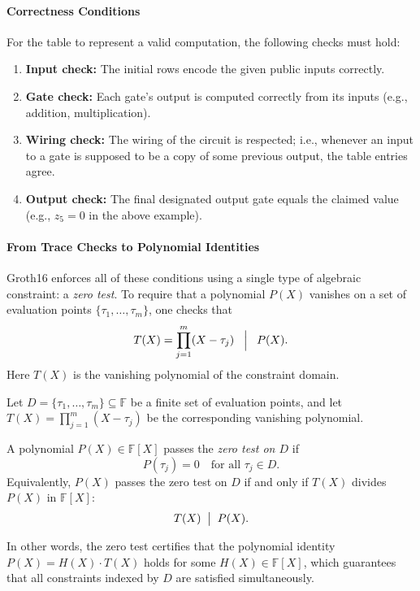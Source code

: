 \paragraph{Correctness Conditions}
For the table to represent a valid computation, the following checks must hold:
\begin{enumerate}
  \item \textbf{Input check:} The initial rows encode the given public inputs correctly.
  \item \textbf{Gate check:} Each gate’s output is computed correctly from its inputs (e.g., addition, multiplication).
  \item \textbf{Wiring check:} The wiring of the circuit is respected; i.e., whenever an input to a gate is supposed to be a copy of some previous output, the table entries agree.
  \item \textbf{Output check:} The final designated output gate equals the claimed value (e.g., $z_5 = 0$ in the above example).
\end{enumerate}

\paragraph{From Trace Checks to Polynomial Identities}
Groth16 enforces all of these conditions using a single type of algebraic constraint:  
a \emph{zero test}. To require that a polynomial $P(X)$ vanishes on a set of evaluation points  
$\{\tau_1, \dots, \tau_m\}$, one checks that
\[
T(X) = \prod_{j=1}^m (X - \tau_j) \;\;\Bigm|\;\; P(X).
\]
Here $T(X)$ is the vanishing polynomial of the constraint domain.  

\begin{definition}
Let $D = \{\tau_1, \dots, \tau_m\} \subseteq \mathbb{F}$ be a finite set of evaluation points, 
and let $T(X) = \prod_{j=1}^m (X - \tau_j)$ be the corresponding vanishing polynomial.  

A polynomial $P(X) \in \mathbb{F}[X]$ passes the \emph{zero test on $D$} if
\[
P(\tau_j) = 0 \quad \text{for all } \tau_j \in D.
\]
Equivalently, $P(X)$ passes the zero test on $D$ if and only if $T(X)$ divides $P(X)$ in $\mathbb{F}[X]$:
\[
T(X) \;\bigm|\; P(X).
\]

In other words, the zero test certifies that the polynomial identity $P(X) = H(X) \cdot T(X)$ holds for some $H(X) \in \mathbb{F}[X]$, 
which guarantees that all constraints indexed by $D$ are satisfied simultaneously.
\end{definition}



